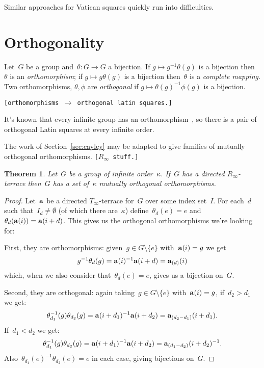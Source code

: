 \documentclass[12pt,a4paper]{article}
\newtheorem{thm}{Theorem}[section]
\begin{document}
Similar approaches for Vatican squares quickly run into difficulties.



\section{Orthogonality}\label{sec:orth}

Let~$G$ be a group and~$\theta: G \rightarrow G$ a bijection.  If $g \mapsto g^{-1}\theta(g)$ is a bijection then~$\theta$ is an {\em orthomorphism}; if  $g \mapsto g\theta(g)$ is a bijection then~$\theta$ is a {\em complete mapping}.  Two orthomorphisms, $\theta, \phi$ are {\em orthogonal} if $g \mapsto \theta(g)^{-1} \phi(g)$ is a bijection.

\texttt{[orthomorphisms $\rightarrow$ orthogonal latin squares.]}

It's known that every infinite group has an orthomorphism~\cite{Bateman50}, so there is a pair of orthogonal Latin squares at every infinite order.


The work of Section~\ref{sec:cayley} may be adapted to give families of mutually orthogonal orthomorphisms. \texttt{[$R_{\infty}$ stuff.]}



\begin{thm}
Let~$G$ be a group of infinite order~$\kappa$.  If~$G$ has a directed $R_{\infty}$-terrace then~$G$ has a set of~$ \kappa$ mutually orthogonal orthomorphisms. 
\end{thm}

\begin{proof}
Let~${\bf a}$ be a directed $T_{\infty}$-terrace for~$G$ over some index set~$I$.  For each~$d$ such that~$I_d \neq \emptyset$ (of which there are~$\kappa$) define~$\theta_d(e) = e$ and $\theta_d( {\bf a}(i) ) = {\bf a}(i+d)$.  This gives us the orthogonal orthomorphisms we're looking for:

First, they are orthomorphisms: given~$g \in G \setminus \{ e \}$ with~${\bf a}(i) = g$ we get
$$g^{-1}\theta_d(g) = {\bf a}(i)^{-1}{\bf a}(i+d) = {\bf a}_{(d)}(i)$$
which, when we also consider that~$\theta_d(e)=e$, gives us a bijection on~$G$.

Second, they are orthogonal: again taking~$g \in G \setminus \{ e \}$ with~${\bf a}(i) = g$, if~$d_2 > d_1$ we get: 
$$\theta_{d_1}^{-1}(g) \theta_{d_2}(g) =  {\bf a}(i+d_1)^{-1}{\bf a}(i+d_2)  = {\bf a}_{(d_2 - d_1)}(i+d_1) .       $$
If~$d_1 < d_2$ we get:
$$\theta_{d_1}^{-1}(g) \theta_{d_2}(g) =  {\bf a}(i+d_1)^{-1}{\bf a}(i+d_2)  = {\bf a}_{(d_1 - d_2)}(i+d_2)^{-1} .       $$
Also~$\theta_{d_1}(e)^{-1}\theta_{d_2}(e) =e$ in each case, giving bijections on~$G$.
\end{proof}
\end{document}
